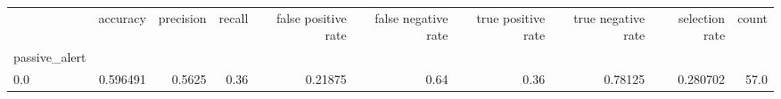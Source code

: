 \begin{tabular}{lrrrrrrrrr}
\toprule
{} &  accuracy &  precision &  recall &  false positive rate &  false negative rate &  true positive rate &  true negative rate &  selection rate &  count \\
passive\_alert &           &            &         &                      &                      &                     &                     &                 &        \\
\midrule
0.0           &  0.596491 &     0.5625 &    0.36 &              0.21875 &                 0.64 &                0.36 &             0.78125 &        0.280702 &   57.0 \\
\bottomrule
\end{tabular}
